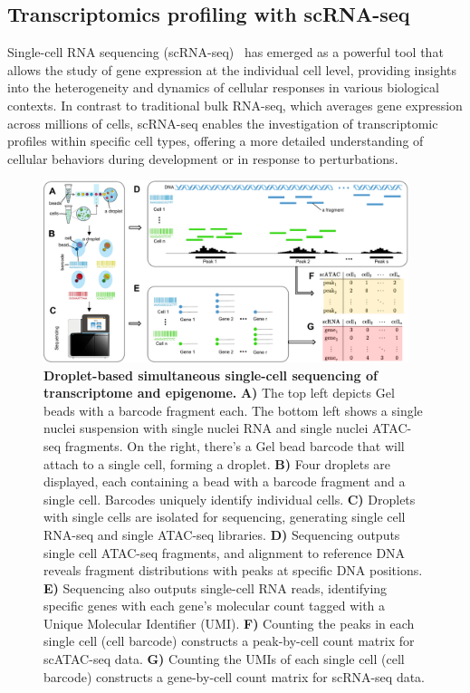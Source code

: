 \subsection{Transcriptomics profiling with scRNA-seq}
\label{background:sec1:scRNA}

Single-cell RNA sequencing (scRNA-seq)~\citep{singlecellsequencing2014, singlecellsequencing2015} has emerged as a powerful tool that allows the study of gene expression at the individual cell level, providing insights into the heterogeneity and dynamics of cellular responses in various biological contexts. In contrast to traditional bulk RNA-seq, which averages gene expression across millions of cells, scRNA-seq enables the investigation of transcriptomic profiles within specific cell types, offering a more detailed understanding of cellular behaviors during development or in response to perturbations.

\begin{figure}[!ht]
	\centering
	\includegraphics[width=0.95\textwidth]{Sequencing/fig}
	\vspace{0.1cm}
	\caption[Droplet-based simultaneous single-cell sequencing of transcriptome and epigenome.]{\textbf{Droplet-based simultaneous single-cell sequencing of transcriptome and epigenome.} \textbf{A)} The top left depicts Gel beads with a barcode fragment each. The bottom left shows a single nuclei suspension with single nuclei RNA and single nuclei ATAC-seq fragments. On the right, there's a Gel bead barcode that will attach to a single cell, forming a droplet. \textbf{B)} Four droplets are displayed, each containing a bead with a barcode fragment and a single cell. Barcodes uniquely identify individual cells. \textbf{C)} Droplets with single cells are isolated for sequencing, generating single cell RNA-seq and single ATAC-seq libraries. \textbf{D)} Sequencing outputs single cell ATAC-seq fragments, and alignment to reference DNA reveals fragment distributions with peaks at specific DNA positions. \textbf{E)} Sequencing also outputs single-cell RNA reads, identifying specific genes with each gene's molecular count tagged with a Unique Molecular Identifier (UMI). \textbf{F)} Counting the peaks in each single cell (cell barcode) constructs a peak-by-cell count matrix for scATAC-seq data. \textbf{G)} Counting the UMIs of each single cell (cell barcode) constructs a gene-by-cell count matrix for scRNA-seq data.}
	\label{fig:scRNA_scATAC_to_count_matrix}
\end{figure}

